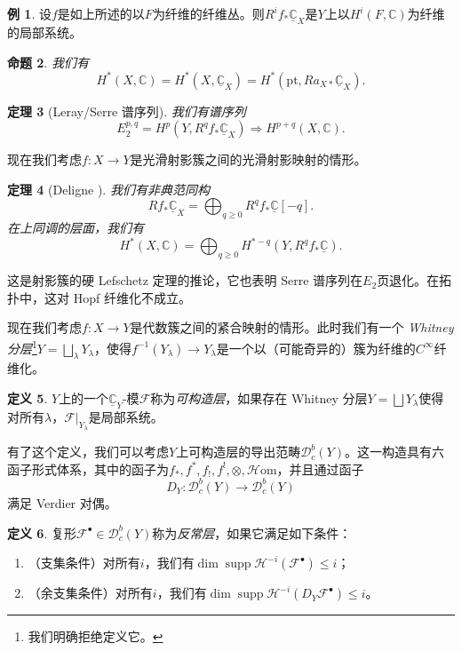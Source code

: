 \documentclass{amsart}
\newtheorem{thm}{定理}[section]
\newtheorem{prop}[thm]{命题}
\theoremstyle{definition}
\newtheorem{defn}[thm]{定义}
\newtheorem{exm}[thm]{例}
\theoremstyle{remark}
\theoremstyle{plain}
\theoremstyle{definition}
\theoremstyle{remark}
\newcommand{\C}{\mathbb{C}}
\newcommand{\mc}[1]{\mathcal{#1}}
\newcommand{\mr}[1]{\mathrm{#1}}
\newcommand{\on}[1]{\operatorname{#1}}
\newcommand{\ul}[1]{\underline{#1}}
\newcommand{\1}{\mathbf{1}}
\newcommand{\2}{\mathbf{2}}
\newcommand{\3}{\mathbf{3}}
\begin{document}
\begin{exm}
    设\(f\)是如上所述的以\(F\)为纤维的纤维丛。则\(R^i f_* \ul{\C}_X\)是\(Y\)上以\(H^i(F, \C)\)为纤维的局部系统。
\end{exm}

\begin{prop}
    我们有
    \[ H^*(X, \C) = H^*(X, \ul{\C}_X) = H^*(\mr{pt}, R a_{X*} \ul{\C}_X). \]
\end{prop}

\begin{thm}[Leray/Serre 谱序列]
    我们有谱序列
    \[ E_2^{p,q} = H^p(Y, R^q f_* \ul{\C}_X) \Rightarrow H^{p+q}(X, \C). \]
\end{thm}

现在我们考虑\(f \colon X \to Y\)是光滑射影簇之间的光滑射影映射的情形。

\begin{thm}[Deligne {\cite{Deligne1968}}]
    我们有非典范同构
    \[ R f_* \ul{\C}_X = \bigoplus_{q \geq 0} R^q f_* \ul{\C}[-q]. \]
    在上同调的层面，我们有
    \[ H^*(X, \C) = \bigoplus_{q \geq 0} H^{*-q}(Y, R^q f_* \ul{\C}). \]
\end{thm}

这是射影簇的硬 Lefschetz 定理的推论，它也表明 Serre 谱序列在\(E_2\)页退化。在拓扑中，这对 Hopf 纤维化不成立。

现在我们考虑\(f \colon X \to Y\)是代数簇之间的紧合映射的情形。此时我们有一个 \textit{Whitney 分层}\footnote{我们明确拒绝定义它。}\(Y = \bigsqcup_{\lambda} Y_{\lambda}\)，使得\(f^{-1}(Y_{\lambda}) \to Y_{\lambda}\)是一个以（可能奇异的）簇为纤维的\(C^{\infty}\)纤维化。

\begin{defn}
    \(Y\)上的一个\(\ul{\C}_Y\)-模\(\mc{F}\)称为\textit{可构造层}，如果存在 Whitney 分层\(Y = \bigsqcup Y_{\lambda}\)使得对所有\(\lambda\)，\(\mc{F}|_{Y_{\lambda}}\)是局部系统。
\end{defn}

有了这个定义，我们可以考虑\(Y\)上可构造层的导出范畴\(\mc{D}_c^b(Y)\)。这一构造具有六函子形式体系，其中的函子为\(f_*, f^*, f_!, f^!, \otimes, \mc{H}\mr{om}\)，并且通过函子
\[ D_Y \colon \mc{D}_c^b(Y) \to \mc{D}_c^b(Y) \]
满足 Verdier 对偶。

\begin{defn}
    复形\(\mc{F}^{\bullet} \in \mc{D}_c^b(Y)\)称为\textit{反常层}，如果它满足如下条件：
    \begin{enumerate}
        \item （支集条件）对所有\(i\)，我们有\(\dim \on{supp} \mc{H}^{-i}(\mc{F}^{\bullet}) \leq i\)；
        \item （余支集条件）对所有\(i\)，我们有\(\dim \on{supp} \mc{H}^{-i}(D_Y \mc{F}^{\bullet}) \leq i\)。
    \end{enumerate}
\end{defn}
\end{document}
